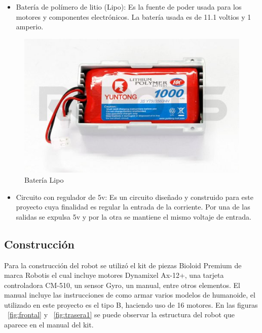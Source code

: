 \begin{itemize}
\item Batería de polímero de litio (Lipo): Es la fuente de poder usada para los motores y componentes electr\'onicos. La batería usada es de 11.1 voltios y 1 amperio. \cite{bateria}
\end{itemize}


\begin{figure}[hbtp]
\centering
\includegraphics[scale=0.3]{imagenes/R-LIPOBAT.jpg}
\caption{Batería Lipo}
\label{bateria}
\end{figure}

\begin{itemize}
\item Circuito con regulador de 5v: Es un circuito diseñado y construido para este proyecto cuya finalidad es regular la entrada de la corriente. Por una de las salidas se expulsa 5v y por la otra se mantiene el mismo voltaje de entrada. 
\end{itemize}


\label{subsection:construccion}
\subsection{Construcción}
Para la construcción del robot se utilizó el kit de piezas Bioloid Premium de marca Robotis el cual incluye motores Dynamixel Ax-12+, una tarjeta controladora CM-510, un sensor Gyro, un manual, entre otros elementos. El manual incluye las instrucciones de como armar varios modelos de humanoide, el utilizado en este proyecto es el tipo B, haciendo uso de 16 motores. En las figuras ~\ref{fig:frontal} y ~\ref{fig:trasera1} se puede observar la estructura del robot que aparece en el manual del kit. 


